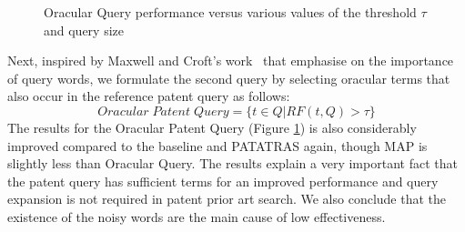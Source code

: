 \begin{figure}[t!]
\begin{centering}
\hspace*{1.5cm}  
\par\end{centering} 
\protect\caption{Oracular Query performance versus various values of the threshold $\tau$ and query size}
\label{fig:oracularpq}
\end{figure}
Next, inspired by Maxwell and Croft's work~\citep{maxwell2013compact} that emphasise on the importance of query words, we formulate the second query by selecting oracular terms that also occur in the reference patent query as follows:
\begin{equation}
 Oracular \; Patent \; Query = \{t\in Q|RF(t, Q)>\tau\}   
 \label{eq:score}
\end{equation}
The results for the Oracular Patent Query (Figure \ref{fig:oracularpq}) is also considerably improved compared to the baseline and PATATRAS again, though MAP is slightly less than Oracular Query. The results explain a very important fact that the patent query has sufficient terms for an improved performance and query expansion is not required in patent prior art search. We also conclude that the existence of the noisy words are the main cause of low effectiveness.  

